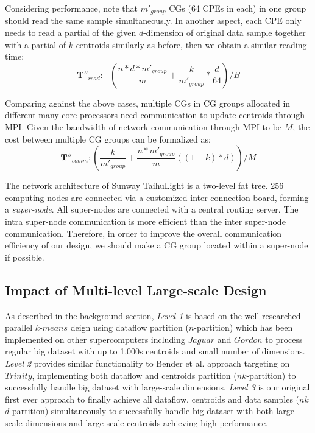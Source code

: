 \documentclass[10pt,journal,compsoc]{IEEEtran}
\begin{document}
Considering performance, note that $m'_{group}$ CGs (64 CPEs in each) in one group should read the same sample simultaneously. In another aspect, each CPE only needs to read a partial of the given $d$-dimension of original data sample together with  a partial of $k$ centroids similarly as before, then we obtain a similar reading time:  
$$\mathbf{T''}_{read}:\ \ \ (\frac{n*d*m'_{group}}{m}+\frac{k}{m'_{group}}*\frac{d}{64})/B$$

Comparing against the above cases, multiple CGs in CG groups allocated in different many-core processors need communication to update centroids through MPI. Given the bandwidth of network communication through MPI to be $M$, the cost between multiple CG groups can be formalized as:
$$\mathbf{T''}_{comm}: (\frac{k}{m'_{group}}+\frac{n*m'_{group}}{m}((1+k)*d))/M $$

The network architecture of Sunway TaihuLight is a two-level fat tree. 256 computing nodes are connected via a customized inter-connection board, forming a \emph{super-node}. All super-nodes are connected with a central routing server. The intra super-node communication is more efficient than the inter super-node communication. Therefore, in order to improve the overall communication efficiency of our design, we should make a CG group located within a super-node if possible. 


\subsection{Impact of Multi-level Large-scale Design}
As described in the background section,  \textit{Level 1} is based on the well-researched parallel $k$-$means$ deign using dataflow partition ($n$-partition) which has been implemented on other supercomputers including $Jaguar$ \cite{kumar2011parallel} and $Gordon$ \cite{cai2015grouping} to process regular big dataset with up to 1,000s centroids and small number of dimensions. \textit{Level 2} provides similar functionality to Bender et al. \cite{bender2015k} approach targeting on $Trinity$, implementing both dataflow and centroids partition ($n$$k$-partition) to successfully handle big dataset with large-scale dimensions. \textit{Level 3} is our original first ever approach to finally achieve all dataflow, centroids and data samples ($n$$k$$d$-partition) simultaneously to successfully handle big dataset with both large-scale dimensions and large-scale centroids achieving high performance.  
\end{document}
